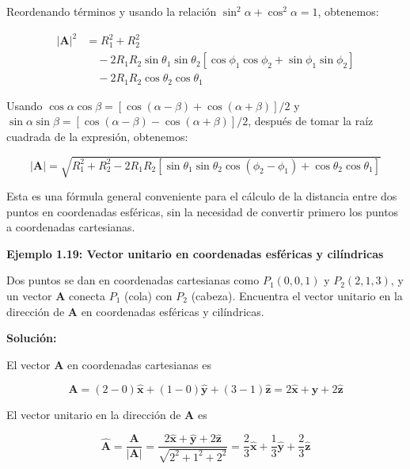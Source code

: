 \documentclass{book}
\begin{document}
Reordenando términos y usando la relación $\sin^2 \alpha + \cos^2 \alpha = 1$, obtenemos:

\begin{align*}
|\mathbf{A}|^2 &= R_1^2 + R_2^2 \\
&\quad - 2 R_1 R_2 \sin \theta_1 \sin \theta_2 [\cos \phi_1 \cos \phi_2 + \sin \phi_1 \sin \phi_2] \\
&\quad - 2 R_1 R_2 \cos \theta_2 \cos \theta_1
\end{align*}

Usando $\cos \alpha \cos \beta = [\cos(\alpha - \beta) + \cos(\alpha + \beta)]/2$ y $\sin \alpha \sin \beta = [\cos(\alpha - \beta) - \cos(\alpha + \beta)]/2$, después de tomar la raíz cuadrada de la expresión, obtenemos:

\begin{equation*}
|\mathbf{A}| = \sqrt{R_1^2 + R_2^2 - 2 R_1 R_2 [\sin \theta_1 \sin \theta_2 \cos(\phi_2 - \phi_1) + \cos \theta_2 \cos \theta_1]}
\end{equation*}

Esta es una fórmula general conveniente para el cálculo de la distancia entre dos puntos en coordenadas esféricas, sin la necesidad de convertir primero los puntos a coordenadas cartesianas.

\textbf{Ejemplo 1.19: Vector unitario en coordenadas esféricas y cilíndricas}

Dos puntos se dan en coordenadas cartesianas como $P_1(0,0,1)$ y $P_2(2,1,3)$, y un vector $\mathbf{A}$ conecta $P_1$ (cola) con $P_2$ (cabeza). Encuentra el vector unitario en la dirección de $\mathbf{A}$ en coordenadas esféricas y cilíndricas.

\textbf{Solución:}

El vector $\mathbf{A}$ en coordenadas cartesianas es

\begin{equation*}
\mathbf{A} = (2 - 0)\mathbf{\hat{x}} + (1 - 0)\mathbf{\hat{y}} + (3 - 1)\mathbf{\hat{z}} = 2\mathbf{\hat{x}} + \mathbf{\hat{y}} + 2\mathbf{\hat{z}}
\end{equation*}

El vector unitario en la dirección de $\mathbf{A}$ es

\begin{equation*}
\mathbf{\hat{A}} = \frac{\mathbf{A}}{|\mathbf{A}|} = \frac{2\mathbf{\hat{x}} + \mathbf{\hat{y}} + 2\mathbf{\hat{z}}}{\sqrt{2^2 + 1^2 + 2^2}} = \frac{2}{3}\mathbf{\hat{x}} + \frac{1}{3}\mathbf{\hat{y}} + \frac{2}{3}\mathbf{\hat{z}}
\end{equation*}
\end{document}
